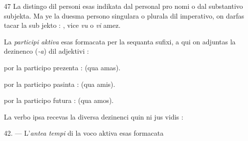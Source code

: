 \begin{VUpage}[51]{47}
\VUblanc{3.54pt}%
La distingo dil personi esas indikata dal personal pro\cc
nomi o dal substantivo subjekta. Ma ye la duesma persono\nl
singulara o plurala dil imperativo, on darfas tacar la sub\cc
jekto : , vice \textit{vu} o \textit{vi} amez.

La \textit{participi aktiva} esas formacata per la sequanta sufixi,\nl
a qui on adjuntas la dezinenco (\textit{-a}) dil adjektivi :

\VUblanc{3.72pt}%
 por la participo prezenta :  (qua amas).

 por la participo pasinta :  (qua amis).

 por la participo futura :  (qua amos).

\VUblanc{3.97pt}%
La verbo  ipsa recevas la diversa dezinenci quin ni jus\nl
vidis : \nl
{}

\VUblanc{5.78pt}%
42. --- L'\textit{antea tempi} di la voco aktiva esas formacata
\parplein
\end{VUpage}

